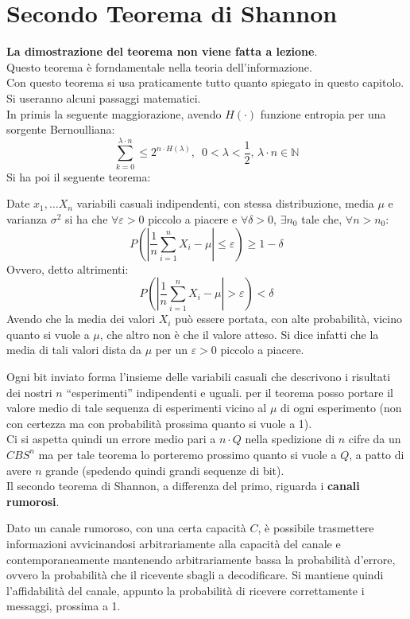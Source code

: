 \documentclass[a4paper,12pt, oneside]{book}
\begin{document}
\section{Secondo Teorema di Shannon}
\textbf{La dimostrazione del teorema non viene fatta a lezione}.\\
Questo teorema è forndamentale nella teoria dell'informazione.\\
Con questo teorema si usa praticamente tutto quanto spiegato in questo
capitolo.\\
Si useranno alcuni passaggi matematici.\\
In primis la seguente maggiorazione, avendo $H(\cdot)$ funzione entropia per una
sorgente Bernoulliana: 
\[\sum_{k=0}^{\lambda \cdot n}\leq 2^{n\cdot
    H(\lambda)},\,\,\,0<\lambda<\frac{1}{2},\, \lambda\cdot n\in \mathbb{N}\]
Si ha poi il seguente teorema:
\begin{teorema}
  Date $x_1,\ldots X_n$ variabili casuali indipendenti, con stessa
  distribuzione, media $\mu$ e varianza $\sigma^2$ si ha che $\forall
  \varepsilon>0$ piccolo a piacere e $\forall\delta>0$, $\exists n_0$ tale che,
  $\forall n> n_0$:
  \[P\left(\left| \frac{1}{n}\sum_{i=1}^n X_i-\mu\right|\leq
      \varepsilon\right)\geq 1-\delta\]
  Ovvero, detto altrimenti:
  \[P\left(\left| \frac{1}{n}\sum_{i=1}^n X_i-\mu\right|>
      \varepsilon\right)<\delta\]
  Avendo che la media dei valori $X_i$ può essere portata, con alte probabilità,
  vicino quanto si vuole a $\mu$, che altro non è che il valore atteso. Si dice
  infatti che la media di tali valori dista da $\mu$ per un $\varepsilon>0$
  piccolo a piacere.
\end{teorema}
Ogni bit inviato forma l'insieme delle variabili casuali che descrivono i
risultati dei nostri $n$ ``esperimenti'' indipendenti e uguali. per il teorema
posso portare il valore medio di tale sequenza di esperimenti vicino al $\mu$ di
ogni esperimento (non con certezza ma con probabilità prossima quanto si vuole a
1).\\
Ci si aspetta quindi un errore medio pari a $n\cdot Q$ nella spedizione di $n$
cifre da un $CBS^n$ ma per tale teorema lo porteremo prossimo quanto si vuole a
$Q$, a patto di avere $n$ grande (spedendo quindi grandi sequenze di bit).\\
Il secondo teorema di Shannon, a differenza del primo, riguarda i \textbf{canali
  rumorosi}. 
\begin{teorema}
  Dato un canale rumoroso, con una certa capacità $C$, è possibile trasmettere
  informazioni avvicinandosi arbitrariamente alla capacità del canale e
  contemporaneamente mantenendo arbitrariamente bassa la probabilità d'errore,
  ovvero la probabilità che il ricevente sbagli a decodificare. Si mantiene
  quindi l'affidabilità del canale, appunto la probabilità di ricevere
  correttamente i messaggi, prossima a 1.
\end{teorema}
\end{document}
